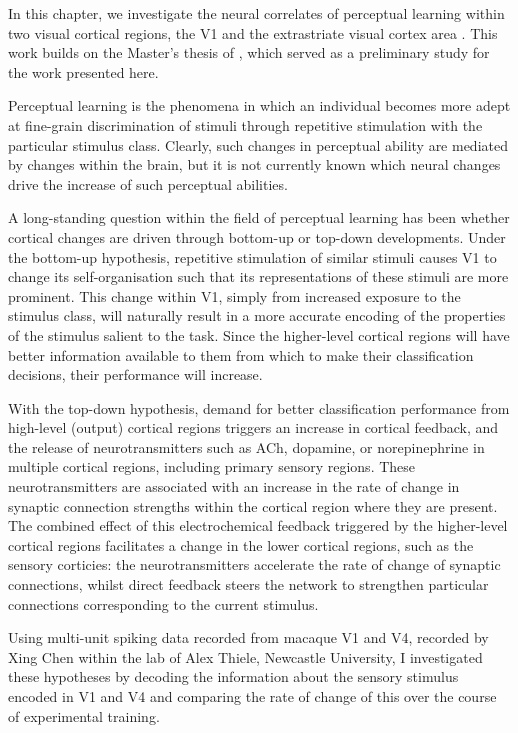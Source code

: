 
In this chapter, we investigate the neural correlates of perceptual learning within two visual cortical regions, the \acf{V1} and the extrastriate visual cortex area .
This work builds on the Master's thesis of \citet{Lowe2012}, which served as a preliminary study for the work presented here.

Perceptual learning is the phenomena in which an individual becomes more adept at fine-grain discrimination of stimuli through repetitive stimulation with the particular stimulus class.
Clearly, such changes in perceptual ability are mediated by changes within the brain, but it is not currently known which neural changes drive the increase of such perceptual abilities.

A long-standing question within the field of perceptual learning has been whether cortical changes are driven through bottom-up or top-down developments.
Under the bottom-up hypothesis, repetitive stimulation of similar stimuli causes \ac{V1} to change its self-organisation such that its representations of these stimuli are more prominent.
This change within \ac{V1}, simply from increased exposure to the stimulus class, will naturally result in a more accurate encoding of the properties of the stimulus salient to the task.
Since the higher-level cortical regions will have better information available to them from which to make their classification decisions, their performance will increase.

With the top-down hypothesis, demand for better classification performance from high-level (output) cortical regions triggers an increase in cortical feedback, and the release of neurotransmitters such as \ac{ACh}, dopamine, or norepinephrine in multiple cortical regions, including primary sensory regions.
These neurotransmitters are associated with an increase in the rate of change in synaptic connection strengths within the cortical region where they are present.
The combined effect of this electrochemical feedback triggered by the higher-level cortical regions facilitates a change in the lower cortical regions, such as the sensory corticies: the neurotransmitters accelerate the rate of change of synaptic connections, whilst direct feedback steers the network to strengthen particular connections corresponding to the current stimulus.

Using multi-unit spiking data recorded from macaque \ac{V1} and \ac{V4}, recorded by Xing Chen within the lab of Alex Thiele, Newcastle University, I investigated these hypotheses by decoding the information about the sensory stimulus encoded in \ac{V1} and \ac{V4} and comparing the rate of change of this over the course of experimental training.
